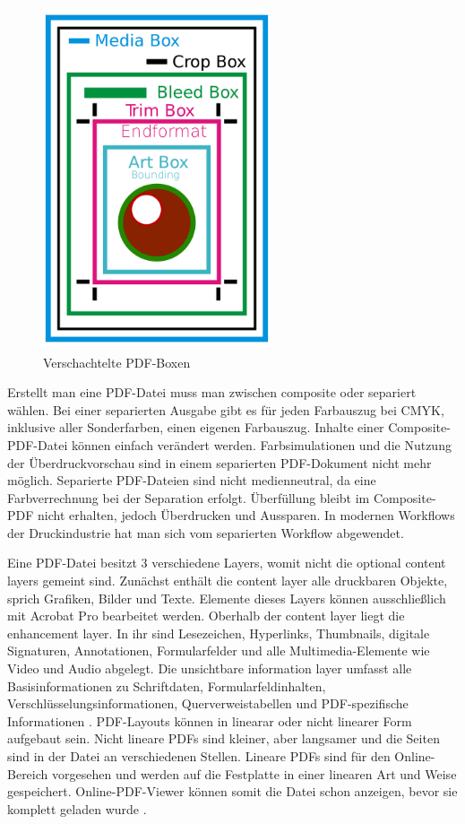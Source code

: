 \begin{figure}[!htb]
	\centering
	\includegraphics[width=0.6\textwidth]{"images/boxen-wiki-pdf-de.png"}
	\caption{Verschachtelte PDF-Boxen \cite{wiki-pdf-de}}
	\label{fig:boxen}
\end{figure}

Erstellt man eine PDF-Datei muss man zwischen composite oder separiert wählen. Bei einer separierten Ausgabe gibt es für jeden Farbauszug bei CMYK, inklusive aller Sonderfarben, einen eigenen Farbauszug. Inhalte einer Composite-PDF-Datei können einfach verändert werden. Farbsimulationen und die Nutzung der Überdruckvorschau sind in einem separierten PDF-Dokument nicht mehr möglich. Separierte PDF-Dateien sind nicht medienneutral, da eine Farbverrechnung bei der Separation erfolgt. Überfüllung bleibt im Composite-PDF nicht erhalten, jedoch Überdrucken und Aussparen. In modernen Workflows der Druckindustrie hat man sich vom separierten Workflow abgewendet.
\par
Eine PDF-Datei besitzt 3 verschiedene Layers, womit nicht die optional content layers gemeint sind. Zunächst enthält die content layer alle druckbaren Objekte, sprich Grafiken, Bilder und Texte. Elemente dieses Layers können ausschließlich mit Acrobat Pro bearbeitet werden. Oberhalb der content layer liegt die enhancement layer. In ihr sind Lesezeichen, Hyperlinks, Thumbnails, digitale Signaturen, Annotationen, Formularfelder und alle Multimedia-Elemente wie Video und Audio abgelegt. Die unsichtbare information layer umfasst alle Basisinformationen zu Schriftdaten, Formularfeldinhalten, Verschlüsselungsinformationen, Querverweistabellen und PDF-spezifische Informationen \cite{schneeberger}. PDF-Layouts können in linearar oder nicht linearer Form aufgebaut sein. Nicht lineare PDFs sind kleiner, aber langsamer und die Seiten sind in der Datei an verschiedenen Stellen. Lineare PDFs sind für den Online-Bereich vorgesehen und werden auf die Festplatte in einer linearen Art und Weise gespeichert. Online-PDF-Viewer können somit die Datei schon anzeigen, bevor sie komplett geladen wurde \cite{fileformat}. 


